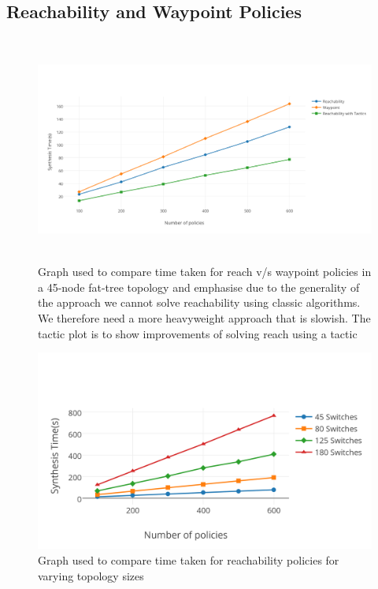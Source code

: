\subsection{Reachability and Waypoint Policies}
\begin{figure}
	\includegraphics[height=7.5cm]{figures/reach-way-tactic.png}
	\caption{Graph used to compare time taken for reach v/s waypoint policies in a 45-node fat-tree topology and emphasise due to the generality of the approach we cannot solve reachability using classic algorithms. We therefore need a more heavyweight approach that is slowish. The tactic plot is to show improvements of solving reach using a tactic}
	\label{fig:reach-way-tactic}
\end{figure}
\begin{figure}
	\includegraphics[width=\columnwidth]{figures/reach-topo.png}
	\caption{Graph used to compare time taken for reachability policies for varying topology sizes}
	\label{fig:reach-topo}
\end{figure}

